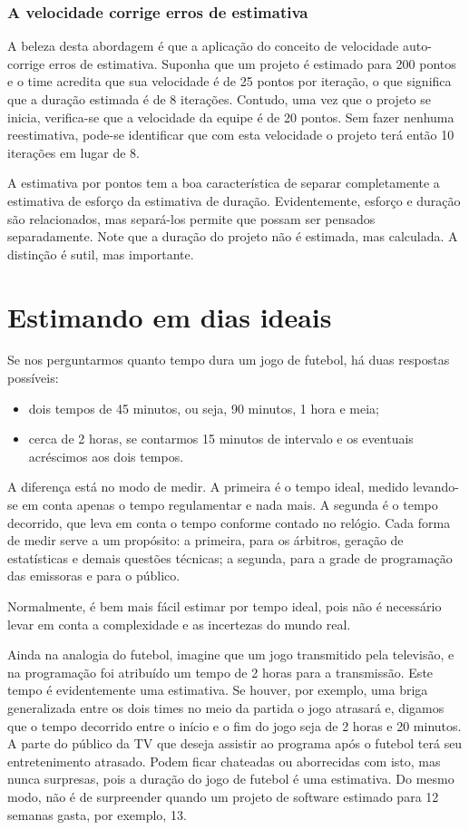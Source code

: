\documentclass[a4paper,abntfigtabnum,noindentfirst]{abnt}
\begin{document}
\subsection{A velocidade corrige erros de estimativa}

A beleza desta abordagem é que a aplicação do conceito de velocidade auto-corrige erros de estimativa. Suponha que um projeto é estimado para 200 pontos e o time acredita que sua velocidade é de 25 pontos por iteração, o que significa que a duração estimada é de 8 iterações. Contudo, uma vez que o projeto se inicia, verifica-se que a velocidade da equipe é de 20 pontos. Sem fazer nenhuma reestimativa, pode-se identificar que com esta velocidade o projeto terá então 10 iterações em lugar de 8.

A estimativa por pontos tem a boa característica de separar completamente a estimativa de esforço da estimativa de duração. Evidentemente, esforço e duração são relacionados, mas separá-los permite que possam ser pensados separadamente. Note que a duração do projeto não é estimada, mas calculada. A distinção é sutil, mas importante.



\chapter{Estimando em dias ideais}

Se nos perguntarmos quanto tempo dura um jogo de futebol, há duas respostas possíveis:
\begin{itemize}
\item dois tempos de 45 minutos, ou seja, 90 minutos, 1 hora e meia;
\item cerca de 2 horas, se contarmos 15 minutos de intervalo e os eventuais acréscimos aos dois tempos.
\end{itemize}

A diferença está no modo de medir. A primeira é o tempo ideal, medido levando-se em conta apenas o tempo regulamentar e nada mais. A segunda é o tempo decorrido, que leva em conta o tempo conforme contado no relógio. Cada forma de medir serve a um propósito: a primeira, para os árbitros, geração de estatísticas e demais questões técnicas; a segunda, para a grade de programação das emissoras e para o público.

Normalmente, é bem mais fácil estimar por tempo ideal, pois não é necessário levar em conta a complexidade e as incertezas do mundo real.

Ainda na analogia do futebol, imagine que um jogo transmitido pela televisão, e na programação foi atribuído um tempo de 2 horas para a transmissão. Este tempo é evidentemente uma estimativa. Se houver, por exemplo, uma briga generalizada entre os dois times no meio da partida o jogo atrasará e, digamos que o tempo decorrido entre o início e o fim do jogo seja de 2 horas e 20 minutos. A parte do público da TV que deseja assistir ao programa após o futebol terá seu entretenimento atrasado. Podem ficar chateadas ou aborrecidas com isto, mas nunca surpresas, pois a duração do jogo de futebol é uma estimativa. Do mesmo modo, não é de surpreender quando um projeto de software estimado para 12 semanas gasta, por exemplo, 13.
\end{document}
